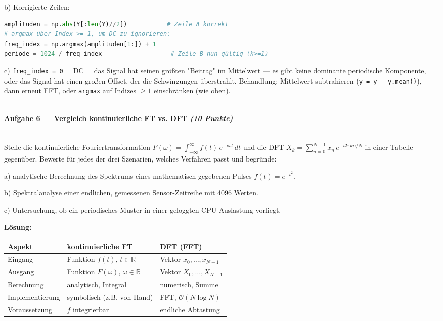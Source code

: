 \documentclass[11pt, a4paper]{article}
\begin{document}
b) Korrigierte Zeilen:

\begin{lstlisting}[language=python]
amplituden = np.abs(Y[:len(Y)//2])           # Zeile A korrekt
# argmax über Index >= 1, um DC zu ignorieren:
freq_index = np.argmax(amplituden[1:]) + 1
periode = 1024 / freq_index                   # Zeile B nun gültig (k>=1)
\end{lstlisting}


c) \texttt{freq\_index = 0} = DC = das Signal hat seinen größten "Beitrag" im Mittelwert — es gibt keine dominante periodische Komponente, oder das Signal hat einen großen Offset, der die Schwingungen überstrahlt. Behandlung: Mittelwert subtrahieren (\texttt{y = y - y.mean()}), dann erneut FFT, oder \texttt{argmax} auf Indizes $\geq 1$ einschränken (wie oben).



\noindent\textcolor{rulegray}{\rule{\linewidth}{0.4pt}}


\paragraph{Aufgabe 6 — Vergleich kontinuierliche FT vs. DFT \textit{(10 Punkte)}}\mbox{}\\[2pt]

Stelle die kontinuierliche Fouriertransformation $F(\omega) = \int_{-\infty}^{\infty} f(t)\,e^{-i\omega t}\,dt$ und die DFT $X_k = \sum_{n=0}^{N-1} x_n\,e^{-i 2\pi kn/N}$ in einer Tabelle gegenüber. Bewerte für jedes der drei Szenarien, welches Verfahren passt und begründe:


a) analytische Berechnung des Spektrums eines mathematisch gegebenen Pulses $f(t) = e^{-t^2}$.


b) Spektralanalyse einer endlichen, gemessenen Sensor-Zeitreihe mit 4096 Werten.


c) Untersuchung, ob ein periodisches Muster in einer geloggten CPU-Auslastung vorliegt.


\textbf{Lösung:}



{\small
\begin{tabularx}{\linewidth}{XXX}
\hline
\rowcolor{tableheadbg}
{\color{white}\textbf{Aspekt}} & {\color{white}\textbf{kontinuierliche FT}} & {\color{white}\textbf{DFT (FFT)}} \\[2pt]
\hline
\endhead
\hline
\endfoot
Eingang & Funktion $f(t)$, $t\in\mathbb{R}$ & Vektor $x_0,\dots,x_{N-1}$ \\
Ausgang & Funktion $F(\omega)$, $\omega\in\mathbb{R}$ & Vektor $X_0,\dots,X_{N-1}$ \\
Berechnung & analytisch, Integral & numerisch, Summe \\
Implementierung & symbolisch (z.B. von Hand) & FFT, $\mathcal{O}(N\log N)$ \\
Voraussetzung & $f$ integrierbar & endliche Abtastung \\
\end{tabularx}
}
\end{document}
